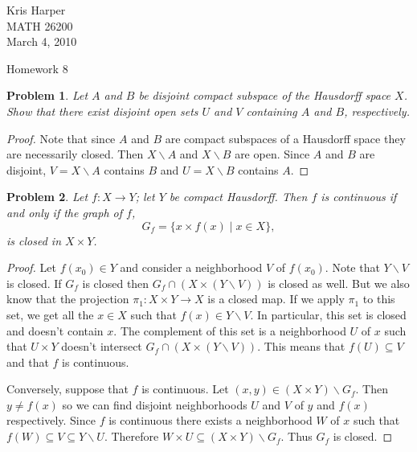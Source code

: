 \documentclass{article}
\newtheorem{problem}{Problem}
\begin{document}
\begin{flushright}
Kris Harper\\

MATH 26200\\

March 4, 2010
\end{flushright}

\begin{center}
Homework 8
\end{center}

\begin{problem}
Let $A$ and $B$ be disjoint compact subspace of the Hausdorff space $X$. Show that there exist disjoint open sets $U$ and $V$ containing $A$ and $B$, respectively.
\end{problem}
\begin{proof}
Note that since $A$ and $B$ are compact subspaces of a Hausdorff space they are necessarily closed. Then $X \backslash A$ and $X \backslash B$ are open. Since $A$ and $B$ are disjoint, $V = X \backslash A$ contains $B$ and $U = X \backslash B$ contains $A$.
\end{proof}

\begin{problem}
Let $f : X \to Y$; let $Y$ be compact Hausdorff. Then $f$ is continuous if and only if the \emph{graph} of $f$,
\[
G_f = \{x \times f(x) \mid x \in X\},
\]
is closed in $X \times Y$.
\end{problem}
\begin{proof}
Let $f(x_0) \in Y$ and consider a neighborhood $V$ of $f(x_0)$. Note that $Y \backslash V$ is closed. If $G_f$ is closed then $G_f \cap (X \times (Y \backslash V))$ is closed as well. But we also know that the projection $\pi_1 : X \times Y \to X$ is a closed map. If we apply $\pi_1$ to this set, we get all the $x \in X$ such that $f(x) \in Y \backslash V$. In particular, this set is closed and doesn't contain $x$. The complement of this set is a neighborhood $U$ of $x$ such that $U \times Y$ doesn't intersect $G_f \cap (X \times (Y \backslash V))$. This means that $f(U) \subseteq V$ and that $f$ is continuous.

Conversely, suppose that $f$ is continuous. Let $(x,y) \in (X \times Y) \backslash G_f$. Then $y \neq f(x)$ so we can find disjoint neighborhoods $U$ and $V$ of $y$ and $f(x)$ respectively. Since $f$ is continuous there exists a neighborhood $W$ of $x$ such that $f(W) \subseteq V \subseteq Y \backslash U$. Therefore $W \times U \subseteq (X \times Y) \backslash G_f$. Thus $G_f$ is closed.
\end{proof} 
\end{document}
